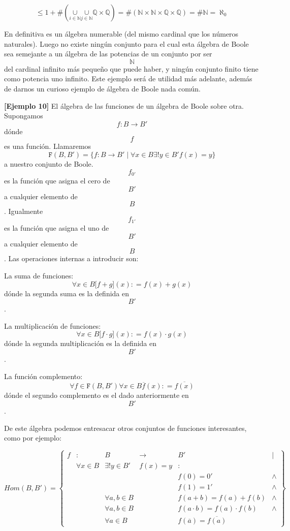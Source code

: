 \begin{enumerate}
  \[{{\leq {1 + {\#\left( {\underset{i \in \mathbb{N}}{\mathbf{\mathrm{\cup}}}\underset{j \in \mathbb{N}}{\mathbf{\mathrm{\cup}}}{\mathbb{Q} \times \mathbb{Q}}} \right)}}} = \#}{\left( {{{\mathbb{N} \times \mathbb{N}} \times \mathbb{Q}} \times \mathbb{Q}} \right) = \#}{\mathbb{N} = \aleph_{0}}\]

  En definitiva es un álgebra numerable (del mismo cardinal que los
  números naturales). Luego no existe ningún conjunto para el cual esta
  álgebra de Boole sea semejante a un álgebra de las potencias de un
  conjunto por ser \[\mathbb{N}\]del cardinal infinito más pequeño que
  puede haber, y ningún conjunto finito tiene como potencia uno
  infinito. Este ejemplo será de utilidad más adelante, además de darnos
  un curioso ejemplo de álgebra de Boole nada común.

  \textbf{{[}Ejemplo 10{]}} El álgebra de las funciones de un álgebra de
  Boole sobre otra. Supongamos \[f:{B\rightarrow B}'\]dónde \[f\] es una
  función. Llamaremos
  \[{\mathtt{F}{({B,B'})}} = {\{{f:{B\rightarrow B}' \mid \forall{x \in B}\exists!{y \in B}'f{{(x)} = y}}\}}\]
  a nuestro conjunto de Boole. \[f_{0'}\] es la función que asigna el
  cero de \[B'\] a cualquier elemento de \[B\]. Igualmente \[f_{1'}\] es
  la función que asigna el uno de \[B'\] a cualquier elemento de \[B\].
  Las operaciones internas a introducir son:

  La suma de funciones:
  \[\forall{x \in B}{\lbrack{f + g}\rbrack}{(x)}{: = f}{{(x)} + g}{(x)}\]dónde
  la segunda suma es la definida en \[B'\].

  La multiplicación de funciones:
  \[\forall{x \in B}{\lbrack{f \cdot g}\rbrack}{(x)}{: = f}{{(x)} \cdot g}{(x)}\]
  dónde la segunda multiplicación es la definida en \[B'\].

  La función complemento:
  \[\forall{f \in \mathtt{F}}{({B,B'})}\forall{x \in B}\overline{f}{(x)}{: = \overline{f{(x)}}}\]dónde
  el segundo complemento es el dado anteriormente en \[B'\].

  De este álgebra podemos entresacar otros conjuntos de funciones
  interesantes, como por ejemplo:

  \[{\mathtt{\mathit{Hom}}{({B,B'})}} = \begin{Bmatrix}
  f & : & B & \rightarrow & {B'} & \mathbf{\mid} \\
   & {\forall{x \in B}} & {\exists!{y \in B}'} & {f{{(x)} = y}} & \mathbf{\mathrm{:}} & \\
   & & & & {f{{(0)} = 0}'} & \land \\
   & & & & {f{{(1)} = 1}'} & \land \\
   & & {\forall a,{b \in B}} & & {f{{({a + b})} = f}{{(a)} + f}{(b)}} & \land \\
   & & {\forall a,{b \in B}} & & {f{{({a \cdot b})} = f}{{(a)} \cdot f}{(b)}} & \land \\
   & & {\forall{a \in B}} & & {f{{(\overline{a})} = \overline{f{(a)}}}} & 
  \end{Bmatrix}\]


\end{enumerate}

